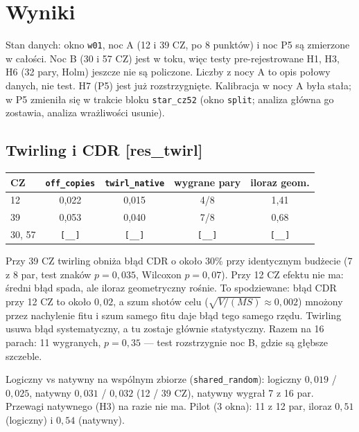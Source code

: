\documentclass[11pt,a4paper]{article}
\newcommand{\PH}{\colorbox{yellow!40}{\texttt{[\_\_]}}}
\newcommand{\slid}[1]{\hfill{\normalfont\small\ttfamily\color{axbluedk}[#1]}}
\begin{document}
\section{Wyniki}

Stan danych: okno \texttt{w01}, noc A (12 i 39 CZ, po 8 punktów) i noc P5 są zmierzone w całości.
Noc B (30 i 57 CZ) jest w toku, więc testy pre-rejestrowane H1, H3, H6 (32 pary, Holm) jeszcze nie
są policzone. Liczby z nocy A to opis połowy danych, nie test. H7 (P5) jest już rozstrzygnięte.
Kalibracja w nocy A była stała; w P5 zmieniła się w trakcie bloku \texttt{star\_cz52} (okno
\texttt{split}; analiza główna go zostawia, analiza wrażliwości usunie).

\subsection{Twirling i CDR \slid{res\_twirl}}

\begin{center}
\begin{tabular}{@{}lcccc@{}}
\toprule
CZ & \texttt{off\_copies} & \texttt{twirl\_native} & wygrane pary & iloraz geom. \\
\midrule
12 & 0,022 & 0,015 & 4/8 & 1,41 \\
39 & 0,053 & 0,040 & 7/8 & 0,68 \\
30, 57 & \PH & \PH & \PH & \PH \\
\bottomrule
\end{tabular}
\end{center}

Przy 39 CZ twirling obniża błąd CDR o około 30\% przy identycznym budżecie (7 z 8 par, test znaków
$p=0{,}035$, Wilcoxon $p=0{,}07$). Przy 12 CZ efektu nie ma: średni błąd spada, ale iloraz
geometryczny rośnie. To spodziewane: błąd CDR przy 12 CZ to około $0{,}02$, a szum shotów celu
($\sqrt{V/(MS)}\approx0{,}002$) mnożony przez nachylenie fitu i szum samego fitu daje błąd tego samego
rzędu. Twirling usuwa błąd systematyczny, a tu zostaje głównie statystyczny. Razem na 16 parach:
11 wygranych, $p=0{,}35$ --- test rozstrzygnie noc B, gdzie są głębsze szczeble.

Logiczny vs natywny na wspólnym zbiorze (\texttt{shared\_random}): logiczny $0{,}019$ / $0{,}025$,
natywny $0{,}031$ / $0{,}032$ (12 / 39 CZ), natywny wygrał 7 z 16 par. Przewagi natywnego (H3) na
razie nie ma. Pilot (3 okna): 11 z 12 par, iloraz $0{,}51$ (logiczny) i $0{,}54$ (natywny).
\end{document}
